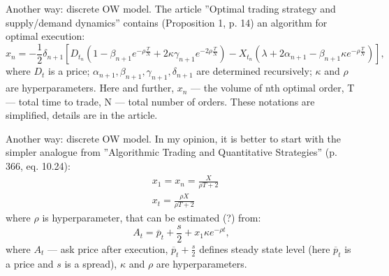 \documentclass[aspectratio=169]{beamer}
\begin{document}
\begin{frame}{Another way: discrete OW model.}
    The article ''Optimal trading strategy and supply/demand dynamics'' contains (Proposition 1, p. 14) 
    an algorithm for optimal execution:
    \begin{equation*}
        x_n = - \frac{1}{2} \delta_{n + 1} [D_{t_n} (1 - \beta_{n + 1} e^{ - \rho \frac{T}{N}} + 2 \kappa \gamma_{n+1} e^{ - 2 \rho \frac{T}{N}}) 
        - X_{t_n} (\lambda + 2 \alpha_{n+1} - \beta_{n+1}\kappa e^{ - \rho \frac{T}{N}}) ], 
    \end{equation*}
    where $D_t$ is a price; $\alpha_{n+1}, \beta_{n+1}, \gamma_{n+1}, \delta_{n + 1}$ are determined recursively; $\kappa$ and $\rho$ 
    are hyperparameters. Here and further, $x_n$ --- the volume of nth optimal order, T --- total time to trade, N --- total number of
    orders. These notations are simplified, details are in the article. 
\end{frame}

\begin{frame}{Another way: discrete OW model.}
    In my opinion, it is better to start with the simpler analogue from ''Algorithmic Trading and
    Quantitative Strategies'' (p. 366, eq. 10.24):
    \begin{align*}
        & x_1 = x_n = \frac{X}{\rho T + 2} \\
        & x_t = \frac{\rho X}{\rho T + 2}
    \end{align*}
    where $\rho$ is hyperparameter, that can be estimated (?) from:
    \begin{equation*}
        A_t = \overline p _t + \frac{s}{2} + x_1 \kappa e^{- \rho t},
    \end{equation*}
    where $A_t$ --- ask price after execution, $\overline p _t + \frac{s}{2}$ defines steady state level 
    (here $\overline p _t$ is a price and $s$ is a spread), $\kappa$ and $\rho$ are hyperparameters. 
\end{frame}
\end{document}
